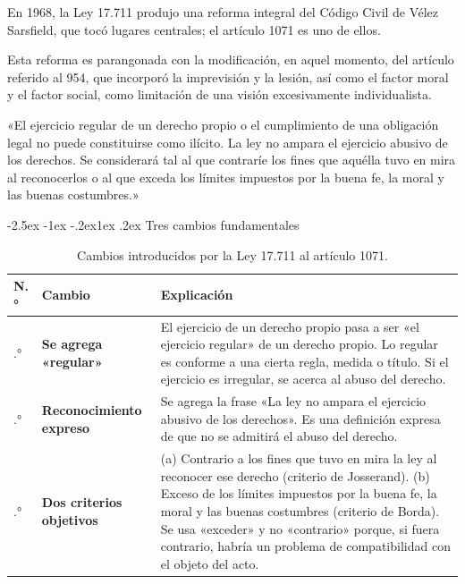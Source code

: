 \documentclass[12pt,oneside]{book}
\makeatletter
\renewcommand\subsection{\@startsection{subsection}{2}{\z@}%
  {-2.5ex \@plus -1ex \@minus -.2ex}{1ex \@plus .2ex}%
  {\normalfont\normalsize\bfseries}}
\makeatother
\begin{document}
En 1968, la Ley 17.711 produjo una reforma integral del Código Civil de Vélez Sarsfield, que tocó lugares centrales; el artículo 1071 es uno de ellos.

Esta reforma es parangonada con la modificación, en aquel momento, del artículo referido al 954, que incorporó la imprevisión y la lesión, así como el factor moral y el factor social, como limitación de una visión excesivamente individualista.

\begin{regla}
«El ejercicio regular de un derecho propio o el cumplimiento de una obligación legal no puede constituirse como ilícito. La ley no ampara el ejercicio abusivo de los derechos. Se considerará tal al que contraríe los fines que aquélla tuvo en mira al reconocerlos o al que exceda los límites impuestos por la buena fe, la moral y las buenas costumbres.»
\end{regla}

\subsection{Tres cambios fundamentales}

\begin{table}[H]
\centering
\begin{tabularx}{\textwidth}{
    >{\centering\arraybackslash}p{1cm}
    >{\raggedright\arraybackslash}p{4.2cm}
    >{\raggedright\arraybackslash}X
}
\toprule
\textbf{N.°} & \textbf{Cambio} & \textbf{Explicación} \\
\midrule
1.° & \textbf{Se agrega «regular»} & El ejercicio de un derecho propio pasa a ser «el ejercicio regular» de un derecho propio. Lo regular es conforme a una cierta regla, medida o título. Si el ejercicio es irregular, se acerca al abuso del derecho. \\
\addlinespace
2.° & \textbf{Reconocimiento expreso} & Se agrega la frase «La ley no ampara el ejercicio abusivo de los derechos». Es una definición expresa de que no se admitirá el abuso del derecho. \\
\addlinespace
3.° & \textbf{Dos criterios objetivos} & (a) Contrario a los fines que tuvo en mira la ley al reconocer ese derecho (criterio de Josserand). (b) Exceso de los límites impuestos por la buena fe, la moral y las buenas costumbres (criterio de Borda). Se usa «exceder» y no «contrario» porque, si fuera contrario, habría un problema de compatibilidad con el objeto del acto. \\
\bottomrule
\end{tabularx}
\caption{Cambios introducidos por la Ley 17.711 al artículo 1071.}
\end{table}
\end{document}
